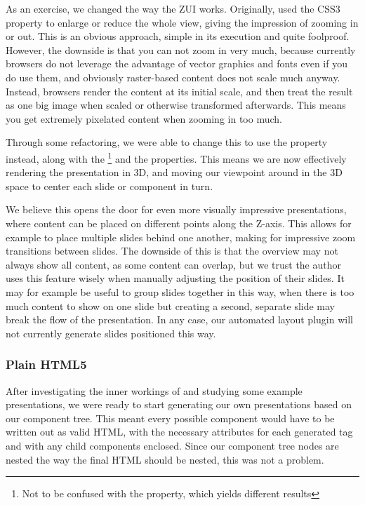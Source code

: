      As an exercise, we changed the way the ZUI works. Originally, \mxp used
     the CSS3  property to enlarge or reduce the whole
     view, giving the impression of zooming in or out. This is an obvious
     approach, simple in its execution and quite foolproof. However, the
     downside is that you can not zoom in very much, because currently browsers
     do not leverage the advantage of vector graphics and fonts even if you do
     use them, and obviously raster-based content does not scale much anyway.
     Instead, browsers render the content at its initial scale, and then treat
     the result as one big image when scaled or otherwise transformed
     afterwards. This means you get extremely pixelated content when zooming in
     too much.

     Through some refactoring, we were able to change this to use the
      property instead, along with the
     \footnote{Not to be confused with the
      property, which yields different results} and
     the  properties. This means we are now
     effectively rendering the presentation in 3D, and moving our viewpoint
     around in the 3D space to center each slide or component in turn.

     We believe this opens the door for even more visually impressive
     presentations, where content can be placed on different points along the
     Z-axis. This allows for example to place multiple slides behind one
     another, making for impressive zoom transitions between slides. The
     downside of this is that the overview may not always show all content, as
     some content can overlap, but we trust the author uses this feature wisely
     when manually adjusting the position of their slides. It may for example
     be useful to group slides together in this way, when there is too much
     content to show on one slide but creating a second, separate slide may
     break the flow of the presentation. In any case, our automated layout
     plugin will not currently generate slides positioned this way.

    \subsubsection{Plain HTML5}

     After investigating the inner workings of \mxp and studying some example
     presentations, we were ready to start generating our own presentations
     based on our component tree. This meant every possible component would
     have to be written out as valid HTML, with the necessary attributes for
     each generated tag and with any child components enclosed. Since our
     component tree nodes are nested the way the final HTML should be nested,
     this was not a problem.

